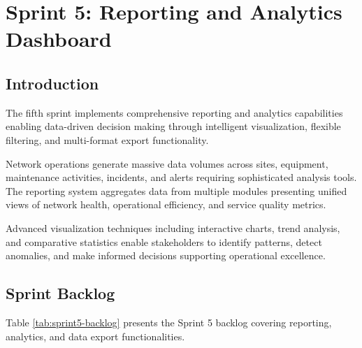 \chapter{Sprint 5: Reporting and Analytics Dashboard}

\section{Introduction}

The fifth sprint implements comprehensive reporting and analytics capabilities enabling data-driven decision making through intelligent visualization, flexible filtering, and multi-format export functionality.

Network operations generate massive data volumes across sites, equipment, maintenance activities, incidents, and alerts requiring sophisticated analysis tools. The reporting system aggregates data from multiple modules presenting unified views of network health, operational efficiency, and service quality metrics.

Advanced visualization techniques including interactive charts, trend analysis, and comparative statistics enable stakeholders to identify patterns, detect anomalies, and make informed decisions supporting operational excellence.

\section{Sprint Backlog}

Table \ref{tab:sprint5-backlog} presents the Sprint 5 backlog covering reporting, analytics, and data export functionalities.

